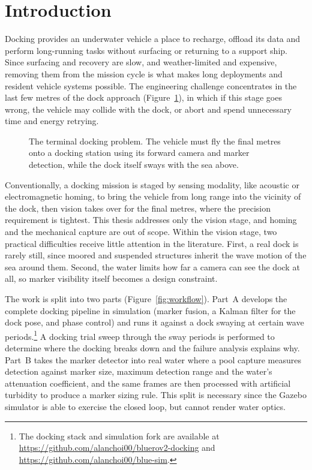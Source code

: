 \section{Introduction}
\label{sec:introduction}

Docking provides an underwater vehicle a place to recharge, offload its data and perform long-running tasks without surfacing or returning to a support ship. Since surfacing and recovery are slow, and weather-limited and expensive, removing them from the mission cycle is what makes long deployments and resident vehicle systems possible. The engineering challenge concentrates in the last few metres of the dock approach (Figure~\ref{fig:docking-problem}), in which if this stage goes wrong, the vehicle may collide with the dock, or abort and spend unnecessary time and energy retrying.

\begin{figure}[H]
    \centering
    
    \caption{The terminal docking problem. The vehicle must fly the final
        metres onto a docking station using its forward camera and marker detection, while the dock itself sways with the sea above.}
    \label{fig:docking-problem}
\end{figure}

Conventionally, a docking mission is staged by sensing modality, like acoustic or electromagnetic homing, to bring the vehicle from long range into the vicinity of the dock, then vision takes over for the final metres, where the precision requirement is tightest. This thesis addresses only the vision stage, and homing and the mechanical capture are out of scope. Within the vision stage, two practical difficulties receive little attention in the literature. First, a real dock is rarely still, since moored and suspended structures inherit the wave motion of the sea around them. Second, the water limits how far a camera can see the dock at all, so marker visibility itself becomes a design constraint.

The work is split into two parts (Figure~\ref{fig:workflow}). Part~A develops the complete docking pipeline in simulation (marker fusion, a Kalman filter for the dock pose, and phase control) and runs it against a dock swaying at certain wave periods.\footnote{The docking stack and simulation fork are available at \url{https://github.com/alanchoi00/bluerov2-docking} and \url{https://github.com/alanchoi00/blue-sim}.} A docking trial sweep through the sway periods is performed to determine where the docking breaks down and the failure analysis explains why. Part~B takes the marker detector into real water where a pool capture measures detection against marker size, maximum detection range and the water's attenuation coefficient, and the same frames are then processed with artificial turbidity to produce a marker sizing rule. This split is necessary since the Gazebo simulator is able to exercise the closed loop, but cannot render water optics.

